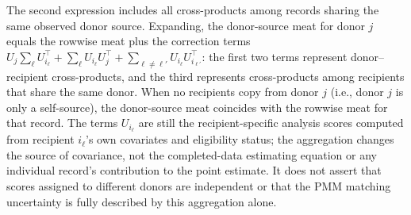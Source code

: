 The second expression includes all cross-products among records sharing
the same observed donor source.  Expanding, the donor-source meat for
donor \(j\) equals the rowwise meat plus the correction terms
\(U_j\sum_\ell U_{i_\ell}^\top + \sum_\ell U_{i_\ell}U_j^\top +
\sum_{\ell\neq\ell'} U_{i_\ell}U_{i_{\ell'}}^\top\): the first two terms
represent donor--recipient cross-products, and the third represents
cross-products among recipients that share
the same donor.  When no recipients copy from donor \(j\) (i.e., donor
\(j\) is only a self-source), the donor-source meat coincides with the
rowwise meat for that record.
The terms \(U_{i_\ell}\) are still the
recipient-specific analysis scores computed from recipient \(i_\ell\)'s
own covariates and eligibility status; the aggregation changes the source of covariance, not the completed-data estimating equation
or any individual record's contribution to the point estimate.
It does not assert that scores assigned to different donors are
independent or that the PMM matching uncertainty is fully described by
this aggregation alone.
